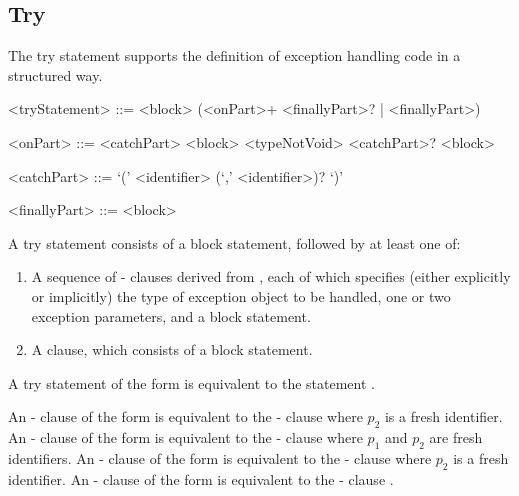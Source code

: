 \documentclass[makeidx]{article}
\begin{document}
{\subsection{Try}

\LMHash{}%
The try statement supports the definition of exception handling code
in a structured way.

\begin{grammar}
<tryStatement> ::= \TRY{} <block> (<onPart>+ <finallyPart>? | <finallyPart>)

<onPart> ::= <catchPart> <block>
  \alt \ON{} <typeNotVoid> <catchPart>? <block>

<catchPart> ::= \CATCH{} `(' <identifier> (`,' <identifier>)? `)'

<finallyPart> ::= \FINALLY{} <block>
\end{grammar}

\LMHash{}%
A try statement consists of a block statement, followed by at least one of:
\begin{enumerate}
\item
  A sequence of \ON-\CATCH{} clauses derived from ,
  each of which specifies
  (either explicitly or implicitly)
  the type of exception object to be handled,
  one or two exception parameters,
  and a block statement.
\item
  A \FINALLY{} clause, which consists of a block statement.
\end{enumerate}

\LMHash{}%
A try statement of the form
is equivalent to the statement
.

\LMHash{}%
An \ON-\CATCH{} clause of the form
is equivalent to the \ON-\CATCH{} clause
where $p_2$ is a fresh identifier.
%
An \ON-\CATCH{} clause of the form
is equivalent to the \ON-\CATCH{} clause
where $p_1$ and $p_2$ are fresh identifiers.
%
An \ON-\CATCH{} clause of the form
is equivalent to the \ON-\CATCH{} clause
where $p_2$ is a fresh identifier.
%
An \ON-\CATCH{} clause of the form
is equivalent to the \ON-\CATCH{} clause
.

}
\end{document}
